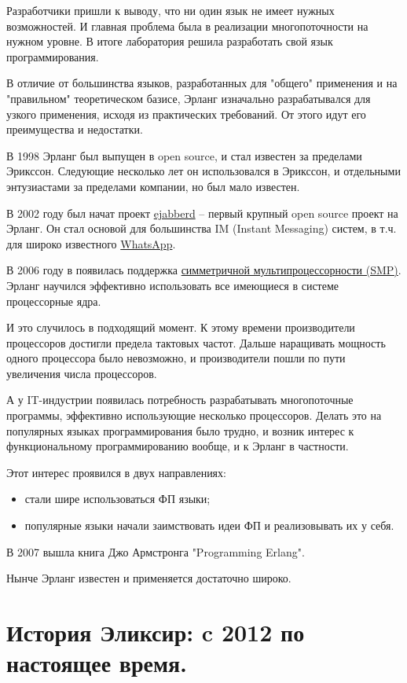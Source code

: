 Разработчики пришли к выводу, что ни один язык не имеет нужных возможностей. И главная проблема была в реализации многопоточности на нужном уровне. В итоге лаборатория решила разработать свой язык программирования.

В отличие от большинства языков, разработанных для "общего" применения и на "правильном" теоретическом базисе, Эрланг изначально разрабатывался для узкого применения, исходя из практических требований. От этого идут его преимущества и недостатки.

В 1998 Эрланг был выпущен в open source, и стал известен за пределами Эрикссон. Следующие несколько лет он использовался в Эрикссон, и отдельными энтузиастами за пределами компании, но был мало известен.

В 2002 году был начат проект \href{https://www.ejabberd.im}{ejabberd} -- первый крупный open source проект на Эрланг. Он стал основой для большинства IM (Instant Messaging) систем, в т.ч. для широко известного \href{https://en.wikipedia.org/wiki/WhatsApp}{WhatsApp}.

В 2006 году в появилась поддержка \href{https://en.wikipedia.org/wiki/Symmetric_multiprocessing}{симметричной мультипроцессорности (SMP)}. Эрланг научился эффективно использовать все имеющиеся в системе процессорные ядра.

И это случилось в подходящий момент. К этому времени производители процессоров достигли предела тактовых частот. Дальше наращивать мощность одного процессора было невозможно, и производители пошли по пути увеличения числа процессоров.

А у IT-индустрии появилась потребность разрабатывать многопоточные программы, эффективно использующие несколько процессоров. Делать это на популярных языках программирования было трудно, и возник интерес к функциональному программированию вообще, и к Эрланг в частности.

Этот интерес проявился в двух направлениях:
\begin{itemize}
\item стали шире использоваться ФП языки;
\item популярные языки начали заимствовать идеи ФП и реализовывать их у себя.
\end{itemize}

В 2007 вышла книга Джо Армстронга "Programming Erlang".

Нынче Эрланг известен и применяется достаточно широко.

\section{История Эликсир: c 2012 по настоящее время.}

